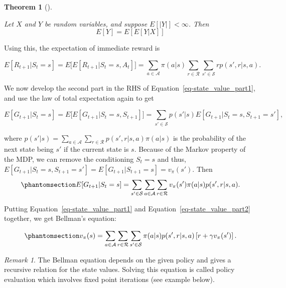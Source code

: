\documentclass[
  letterpaper,
]{report}
\theoremstyle{definition}
\theoremstyle{plain}
\newtheorem{theorem}{Theorem}[chapter]
\theoremstyle{definition}
\theoremstyle{remark}
\newtheorem*{remark}{Remark}
\begin{document}
\begin{theorem}[]\protect\hypertarget{thm-total_expectation}{}\label{thm-total_expectation}

Let \(X\) and \(Y\) be random variables, and suppose \(E[|Y|]<\infty\).
Then \[
E[Y] = E\left[E[Y|X]\right]
\]

\end{theorem}

Using this, the expectation of immediate reward is

\[
E[R_{t+1}| S_t = s] = E\big[E[R_{t+1}|S_t = s,A_t]\big] = \sum_{a\in\mathcal{A}}\pi(a|s)\sum_{r\in\mathcal{R}} \sum_{s'\in \mathcal{S}}rp(s',r|s,a).
\]

We now develop the second part in the RHS of
Equation~\ref{eq-state_value_part1}, and use the law of total
expectation again to get

\[
E[G_{t+1} | S_t = s] = E\big[E[G_{t+1} | S_t = s , S_{t+1}]\big] = \sum_{s'\in\mathcal{S}}p(s'|s)E[G_{t+1}|S_t = s, S_{t+1} = s'],
\]

where
\(p(s'|s) = \sum_{a\in\mathcal{A}} \sum_{r\in\mathcal{R}}p(s',r|s,a)\pi(a|s)\)
is the probability of the next state being \(s'\) if the current state
is \(s\). Because of the Markov property of the MDP, we can remove the
conditioning \(S_t = s\) and thus,
\(E[G_{t+1}|S_t = s, S_{t+1} = s'] = E[G_{t+1}|S_{t+1} = s] = v_\pi(s')\).
Then \begin{equation}\phantomsection\label{eq-state_value_part2}{
E[G_{t+1} | S_t = s] = \sum_{s'\in\mathcal{S}}\sum_{a\in\mathcal{A}}\sum_{r\in\mathcal{R}}v_\pi(s')\pi(a|s)p(s',r|s,a).
}\end{equation}

Putting Equation~\ref{eq-state_value_part1} and
Equation~\ref{eq-state_value_part2} together, we get Bellman's equation:

\begin{equation}\phantomsection\label{eq-Bellman}{
v_\pi(s) = \sum_{a\in\mathcal{A}}\sum_{r\in\mathcal{R}}\sum_{s'\in\mathcal{S}}\pi(a|s)p(s',r|s,a)\left[ r + \gamma v_\pi(s')\right].
}\end{equation}

\begin{remark}
The Bellman equation depends on the given policy and gives a recursive
relation for the state values. Solving this equation is called policy
evaluation which involves fixed point iterations (see example below).
\end{remark}
\end{document}
